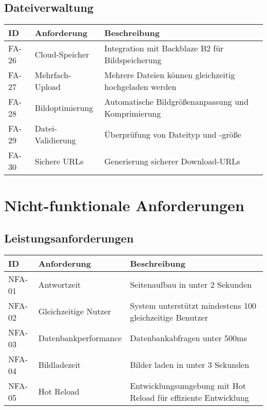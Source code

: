\documentclass[a4paper,12pt]{article}
\begin{document}
\subsection{Dateiverwaltung}
\begin{longtable}{|p{}|p{}|p{}|}
\hline
\textbf{ID} & \textbf{Anforderung} & \textbf{Beschreibung} \\
\hline
FA-26 & Cloud-Speicher & Integration mit Backblaze B2 für Bildspeicherung \\
\hline
FA-27 & Mehrfach-Upload & Mehrere Dateien können gleichzeitig hochgeladen werden \\
\hline
FA-28 & Bildoptimierung & Automatische Bildgrößenanpassung und Komprimierung \\
\hline
FA-29 & Datei-Validierung & Überprüfung von Dateityp und -größe \\
\hline
FA-30 & Sichere URLs & Generierung sicherer Download-URLs \\
\hline
\end{longtable}

\section{Nicht-funktionale Anforderungen}

\subsection{Leistungsanforderungen}
\begin{longtable}{|p{}|p{}|p{}|}
\hline
\textbf{ID} & \textbf{Anforderung} & \textbf{Beschreibung} \\
\hline
NFA-01 & Antwortzeit & Seitenaufbau in unter 2 Sekunden \\
\hline
NFA-02 & Gleichzeitige Nutzer & System unterstützt mindestens 100 gleichzeitige Benutzer \\
\hline
NFA-03 & Datenbankperformance & Datenbankabfragen unter 500ms \\
\hline
NFA-04 & Bildladezeit & Bilder laden in unter 3 Sekunden \\
\hline
NFA-05 & Hot Reload & Entwicklungsumgebung mit Hot Reload für effiziente Entwicklung \\
\hline
\end{longtable}
\end{document}
